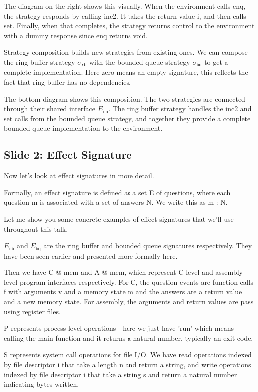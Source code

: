 \documentclass{article}
\newcommand{\kw}[1]{\ensuremath{\mathtt{#1}}}
\begin{document}
The diagram on the right shows this visually. When the environment calls enq,
the strategy responds by calling inc2. It takes the return value i, and then
calls set. Finally, when that completes, the strategy returns control to the
environment with a dummy response since enq returns void.

Strategy composition builds new strategies from existing ones. We can compose
the ring buffer strategy $\sigma_\kw{rb}$ with the bounded queue strategy
$\sigma_\kw{bq}$ to get a complete implementation. Here zero means an empty
signature, this reflects the fact that ring buffer has no dependencies.

The bottom diagram shows this composition. The two strategies are connected
through their shared interface $E_\kw{rb}$. The ring buffer strategy handles the
inc2 and set calls from the bounded queue strategy, and together they
provide a complete bounded queue implementation to the environment.

\subsection{Slide 2: Effect Signature}

Now let's look at effect signatures in more detail.

Formally, an effect signature is defined as a set E of questions, where each
question m is associated with a set of answers N. We write this as m : N.

Let me show you some concrete examples of effect signatures that we'll use
throughout this talk.

$E_\kw{rb}$ and $E_\kw{bq}$
are the ring buffer and bounded queue signatures respectively.
They have been seen earlier and presented more formally here.

Then we have C @ mem and A @ mem, which represent C-level and assembly-level
program interfaces respectively. For C, the question events are function calls f
with arguments v and a memory state m and the answers are a return value and a
new memory state. For assembly, the arguments and return values are pass using
register files.

P represents process-level operations - here we just have 'run' which means
calling the main function and it returns a natural number, typically an exit
code.

S represents system call operations for file I/O. We have read operations
indexed by file descriptor i that take a length n and return a string, and write
operations indexed by file descriptor i that take a string s and return a
natural number indicating bytes written.
\end{document}
